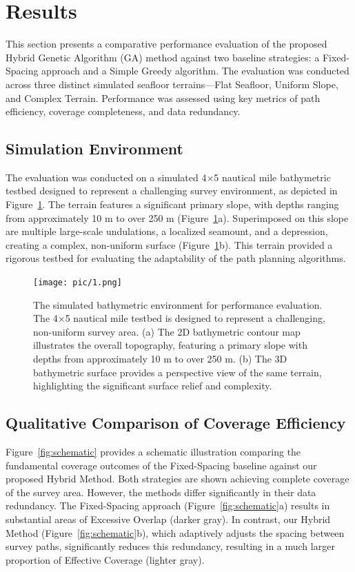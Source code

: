 \documentclass[compress]{cm}
\begin{document}
\section{Results}
This section presents a comparative performance evaluation of the proposed Hybrid Genetic Algorithm (GA) method against two baseline strategies: a Fixed-Spacing approach and a Simple Greedy algorithm. The evaluation was conducted across three distinct simulated seafloor terrains—Flat Seafloor, Uniform Slope, and Complex Terrain. Performance was assessed using key metrics of path efficiency, coverage completeness, and data redundancy.

\subsection{Simulation Environment}
The evaluation was conducted on a simulated 4×5 nautical mile bathymetric testbed designed to represent a challenging survey environment, as depicted in Figure~\ref{fig:env}. The terrain features a significant primary slope, with depths ranging from approximately 10 m to over 250 m (Figure~\ref{fig:env}a). Superimposed on this slope are multiple large-scale undulations, a localized seamount, and a depression, creating a complex, non-uniform surface (Figure~\ref{fig:env}b). This terrain provided a rigorous testbed for evaluating the adaptability of the path planning algorithms.

\begin{figure}[H]
	\centering
	\texttt{[image: pic/1.png]}
	\caption{The simulated bathymetric environment for performance evaluation. The 4×5 nautical mile testbed is designed to represent a challenging, non-uniform survey area. (a) The 2D bathymetric contour map illustrates the overall topography, featuring a primary slope with depths from approximately 10 m to over 250 m. (b) The 3D bathymetric surface provides a perspective view of the same terrain, highlighting the significant surface relief and complexity.}
	\label{fig:env}
\end{figure}

\subsection{Qualitative Comparison of Coverage Efficiency}
Figure~\ref{fig:schematic} provides a schematic illustration comparing the fundamental coverage outcomes of the Fixed-Spacing baseline against our proposed Hybrid Method. Both strategies are shown achieving complete coverage of the survey area. However, the methods differ significantly in their data redundancy. The Fixed-Spacing approach (Figure~\ref{fig:schematic}a) results in substantial areas of Excessive Overlap (darker gray). In contrast, our Hybrid Method (Figure~\ref{fig:schematic}b), which adaptively adjusts the spacing between survey paths, significantly reduces this redundancy, resulting in a much larger proportion of Effective Coverage (lighter gray).
\end{document}
